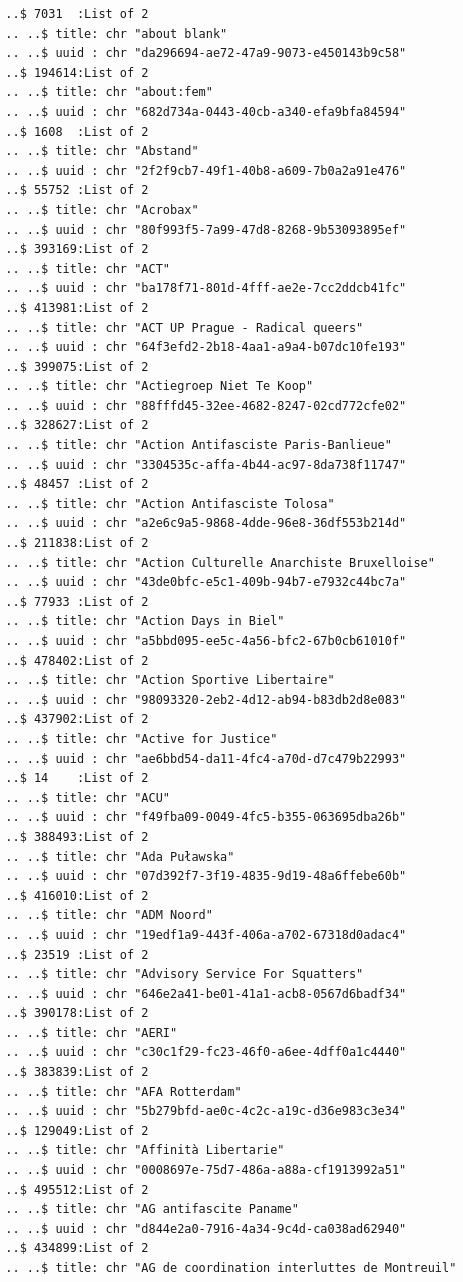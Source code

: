 \documentclass[
  letterpaper,
  DIV=11,
  numbers=noendperiod]{scrartcl}
\begin{document}
\begin{verbatim}
  ..$ 7031  :List of 2
  .. ..$ title: chr "about blank"
  .. ..$ uuid : chr "da296694-ae72-47a9-9073-e450143b9c58"
  ..$ 194614:List of 2
  .. ..$ title: chr "about:fem"
  .. ..$ uuid : chr "682d734a-0443-40cb-a340-efa9bfa84594"
  ..$ 1608  :List of 2
  .. ..$ title: chr "Abstand"
  .. ..$ uuid : chr "2f2f9cb7-49f1-40b8-a609-7b0a2a91e476"
  ..$ 55752 :List of 2
  .. ..$ title: chr "Acrobax"
  .. ..$ uuid : chr "80f993f5-7a99-47d8-8268-9b53093895ef"
  ..$ 393169:List of 2
  .. ..$ title: chr "ACT"
  .. ..$ uuid : chr "ba178f71-801d-4fff-ae2e-7cc2ddcb41fc"
  ..$ 413981:List of 2
  .. ..$ title: chr "ACT UP Prague - Radical queers"
  .. ..$ uuid : chr "64f3efd2-2b18-4aa1-a9a4-b07dc10fe193"
  ..$ 399075:List of 2
  .. ..$ title: chr "Actiegroep Niet Te Koop"
  .. ..$ uuid : chr "88fffd45-32ee-4682-8247-02cd772cfe02"
  ..$ 328627:List of 2
  .. ..$ title: chr "Action Antifasciste Paris-Banlieue"
  .. ..$ uuid : chr "3304535c-affa-4b44-ac97-8da738f11747"
  ..$ 48457 :List of 2
  .. ..$ title: chr "Action Antifasciste Tolosa"
  .. ..$ uuid : chr "a2e6c9a5-9868-4dde-96e8-36df553b214d"
  ..$ 211838:List of 2
  .. ..$ title: chr "Action Culturelle Anarchiste Bruxelloise"
  .. ..$ uuid : chr "43de0bfc-e5c1-409b-94b7-e7932c44bc7a"
  ..$ 77933 :List of 2
  .. ..$ title: chr "Action Days in Biel"
  .. ..$ uuid : chr "a5bbd095-ee5c-4a56-bfc2-67b0cb61010f"
  ..$ 478402:List of 2
  .. ..$ title: chr "Action Sportive Libertaire"
  .. ..$ uuid : chr "98093320-2eb2-4d12-ab94-b83db2d8e083"
  ..$ 437902:List of 2
  .. ..$ title: chr "Active for Justice"
  .. ..$ uuid : chr "ae6bbd54-da11-4fc4-a70d-d7c479b22993"
  ..$ 14    :List of 2
  .. ..$ title: chr "ACU"
  .. ..$ uuid : chr "f49fba09-0049-4fc5-b355-063695dba26b"
  ..$ 388493:List of 2
  .. ..$ title: chr "Ada Puławska"
  .. ..$ uuid : chr "07d392f7-3f19-4835-9d19-48a6ffebe60b"
  ..$ 416010:List of 2
  .. ..$ title: chr "ADM Noord"
  .. ..$ uuid : chr "19edf1a9-443f-406a-a702-67318d0adac4"
  ..$ 23519 :List of 2
  .. ..$ title: chr "Advisory Service For Squatters"
  .. ..$ uuid : chr "646e2a41-be01-41a1-acb8-0567d6badf34"
  ..$ 390178:List of 2
  .. ..$ title: chr "AERI"
  .. ..$ uuid : chr "c30c1f29-fc23-46f0-a6ee-4dff0a1c4440"
  ..$ 383839:List of 2
  .. ..$ title: chr "AFA Rotterdam"
  .. ..$ uuid : chr "5b279bfd-ae0c-4c2c-a19c-d36e983c3e34"
  ..$ 129049:List of 2
  .. ..$ title: chr "Affinità Libertarie"
  .. ..$ uuid : chr "0008697e-75d7-486a-a88a-cf1913992a51"
  ..$ 495512:List of 2
  .. ..$ title: chr "AG antifascite Paname"
  .. ..$ uuid : chr "d844e2a0-7916-4a34-9c4d-ca038ad62940"
  ..$ 434899:List of 2
  .. ..$ title: chr "AG de coordination interluttes de Montreuil"

\end{verbatim}
\end{document}
